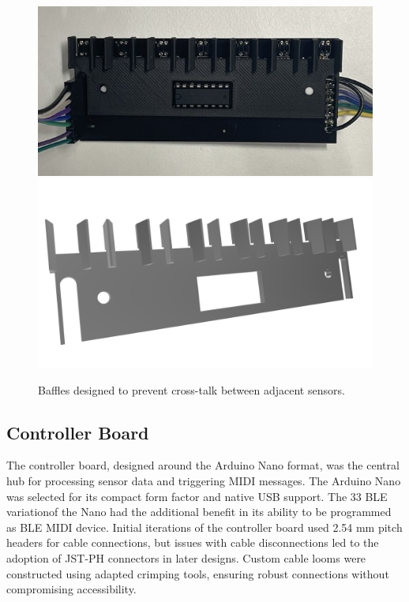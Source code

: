 \begin{figure}
    \centering
    \includegraphics[width=\linewidth]{src/images/sensor-board-w-baffles.jpeg}
    \\
    \includegraphics[width=\linewidth]{src/images/baffles.png}
    \caption{Baffles designed to prevent cross-talk between adjacent sensors.}
    \Description{}
    \label{fig:baffles}
\end{figure}
\subsection{Controller Board}\label{controller-board}

The controller board, designed around the Arduino Nano format, was the central hub for processing sensor data and triggering MIDI messages. The Arduino Nano was selected for its compact form factor and native USB support. The 33 BLE variationof the Nano had the additional benefit in its ability to be programmed as BLE MIDI device.  Initial iterations of the controller board used 2.54 mm pitch headers for cable connections, but issues with cable disconnections led to the adoption of JST-PH connectors in later designs. Custom cable looms were constructed using adapted crimping tools, ensuring robust connections without compromising accessibility.

